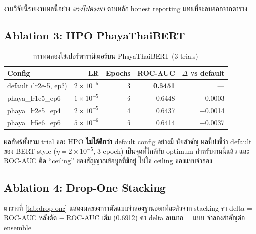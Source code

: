 งานวิจัยนี้รายงานผลนี้อย่าง \emph{ตรงไปตรงมา} ตามหลัก honest reporting
แทนที่จะลบออกจากตาราง

\subsection{Ablation 3: HPO PhayaThaiBERT}

\begin{table}[H]
\centering
\caption{การทดลองไฮเปอร์พารามิเตอร์บน PhayaThaiBERT (3 trials)}
\label{tab:hpo-phaya}
\begin{tabularx}{\textwidth}{Xrrrr}
\toprule
\textbf{Config} & \textbf{LR} & \textbf{Epochs} & \textbf{ROC-AUC} & \textbf{$\Delta$ vs default} \\
\midrule
default (lr2e-5, ep3)                  & $2\!\times\!10^{-5}$ & 3 & \textbf{0.6451} & --- \\
phaya\_lr1e5\_ep6                       & $1\!\times\!10^{-5}$ & 6 & 0.6448 & $-$0.0003 \\
phaya\_lr2e5\_ep4                       & $2\!\times\!10^{-5}$ & 4 & 0.6437 & $-$0.0014 \\
phaya\_lr5e6\_ep6                       & $5\!\times\!10^{-6}$ & 6 & 0.6414 & $-$0.0037 \\
\bottomrule
\end{tabularx}
\end{table}

ผลลัพธ์ทั้งสาม trial ของ HPO \textbf{ไม่ได้ดีกว่า} default config อย่างมี
นัยสำคัญ ผลนี้บ่งชี้ว่า default ของ BERT-style ($\eta=2\!\times\!10^{-5}$,
3 epoch) เป็นจุดที่ใกล้กับ optimum สำหรับงานนี้แล้ว และ ROC-AUC ติด ``ceiling''
ของสัญญาณข้อมูลที่มีอยู่ ไม่ใช่ ceiling ของแบบจำลอง

\subsection{Ablation 4: Drop-One Stacking}

ตารางที่ \ref{tab:drop-one} แสดงผลของการตัดแบบจำลองฐานออกทีละตัวจาก stacking
ค่า delta = ROC-AUC หลังตัด $-$ ROC-AUC เต็ม (0.6912) ค่า delta ลบมาก = แบบ
จำลองสำคัญต่อ ensemble

